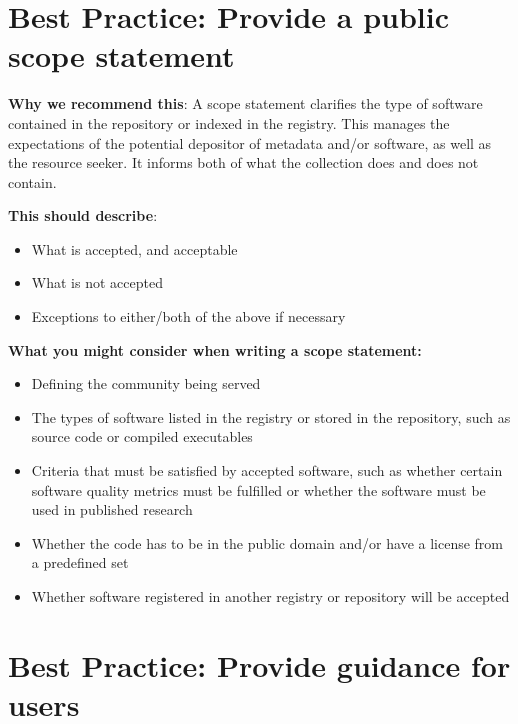 \documentclass[11pt]{article}
\begin{document}
\section{Best Practice: Provide a public scope statement}
\label{best-practice-provide-a-public-scope-statement}

\textbf{Why we recommend this}: A scope statement clarifies the type of software contained in the repository or indexed in the registry. This manages the expectations of the potential depositor of metadata and/or software, as well as the resource seeker. It informs both of what the collection does and does not contain.

\textbf{This should describe}:

\begin{itemize}
\item What is accepted, and acceptable

\item What is not accepted

\item Exceptions to either/both of the above if necessary

\end{itemize}

\textbf{What you might consider when writing a scope statement: }

\begin{itemize}
\item Defining the community being served

\item The types of software listed in the registry or stored in the repository, such as source code or compiled executables

\item Criteria that must be satisfied by accepted software, such as whether certain software quality metrics must be fulfilled or whether the software must be used in published research

\item Whether the code has to be in the public domain and/or have a license from a predefined set

\item Whether software registered in another registry or repository will be accepted

\end{itemize}


\section{Best Practice: Provide guidance for users}
\label{best-practice-provide-guidance-for-users}
\end{document}
